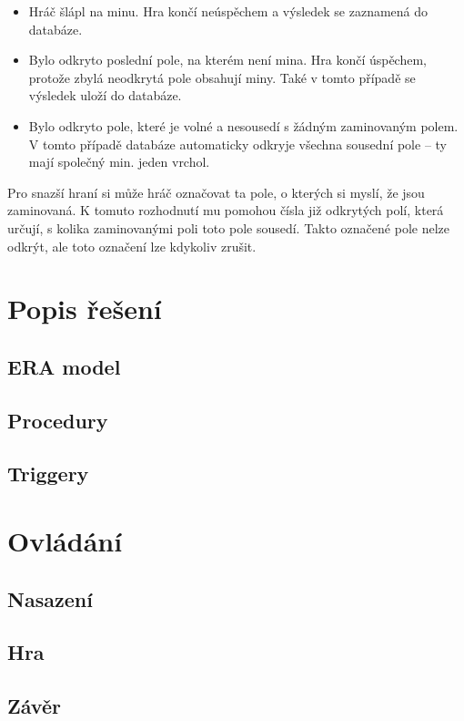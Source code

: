 \documentclass[12pt, a4paper]{article}
\begin{document}
\begin{itemize}
\item Hráč šlápl na minu. Hra končí neúspěchem a výsledek se zaznamená do databáze.
\item Bylo odkryto poslední pole, na kterém není mina. Hra končí úspěchem, protože zbylá neodkrytá pole obsahují miny. Také v tomto případě se výsledek uloží do databáze.
\item Bylo odkryto pole, které je volné a nesousedí s žádným zaminovaným polem. V tomto případě databáze automaticky odkryje všechna sousední pole – ty mají společný min. jeden vrchol.
\end{itemize}

Pro snazší hraní si může hráč označovat ta pole, o kterých si myslí, že jsou zaminovaná. K tomuto rozhodnutí mu pomohou čísla již odkrytých polí, která určují, s kolika zaminovanými poli toto pole sousedí. Takto označené pole nelze odkrýt, ale toto označení lze kdykoliv zrušit.

\newpage

\section{Popis řešení}

\subsection{ERA model}

\subsection{Procedury}

\subsection{Triggery}

\section{Ovládání}

\subsection{Nasazení}

\subsection{Hra}

\subsection{Závěr}
\end{document}
